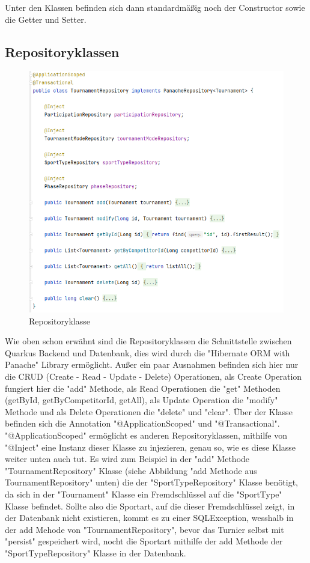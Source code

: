 Unter den Klassen befinden sich dann standardmäßig noch der Constructor sowie die Getter und Setter.

\subsection{Repositoryklassen}

\begin{figure}[H]
    \includegraphics[scale=0.8]{pics/backend/repository_class.png}
    \caption{Repositoryklasse}
\end{figure}

Wie oben schon erwähnt sind die Repositoryklassen die Schnittstelle zwischen Quarkus Backend und Datenbank, dies wird durch die "Hibernate ORM with Panache" Library ermöglicht. 
Außer ein paar Ausnahmen befinden sich hier nur die CRUD (Create - Read - Update - Delete) Operationen, als Create Operation fungiert hier die "add" Methode, 
als Read Operationen die "get" Methoden (getById, getByCompetitorId, getAll), als Update Operation die "modify" Methode und als Delete Operationen die "delete" und "clear". 
Über der Klasse befinden sich die Annotation "@ApplicationScoped" und "@Transactional". "@ApplicationScoped" ermöglicht es anderen Repositoryklassen, mithilfe von "@Inject" eine Instanz dieser Klasse zu injezieren, genau so, 
wie es diese Klasse weiter unten auch tut. Es wird zum Beispiel in der "add" Methode "TournamentRepository" Klasse (siehe Abbildung "add Methode aus TournamentRepository" unten) die 
der "SportTypeRepository" Klasse benötigt, da sich in der "Tournament" Klasse ein Fremdschlüssel auf die "SportType" Klasse befindet. Sollte also die Sportart, 
auf die dieser Fremdschlüssel zeigt, in der Datenbank nicht existieren, kommt es zu einer SQLException, wesshalb in der add Mehode von "TournamentRepository", 
bevor das Turnier selbst mit "persist" gespeichert wird, nocht die Sportart mithilfe der add Methode der "SportTypeRepository" Klasse in der Datenbank. 

